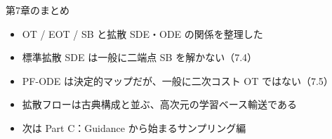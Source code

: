 \asmain
\begin{frame}{第7章のまとめ}
    \begin{itemize}
        \item OT / EOT / SB と拡散 SDE・ODE の関係を整理した
        \item 標準拡散 SDE は一般に二端点 SB を解かない（7.4）
        \item PF-ODE は決定的マップだが、一般に二次コスト OT ではない（7.5）
        \item 拡散フローは古典構成と並ぶ、高次元の学習ベース輸送である
        \item 次は Part C：Guidance から始まるサンプリング編
    \end{itemize}
\end{frame}
